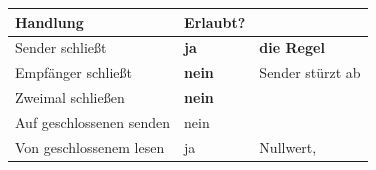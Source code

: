 \begin{merksatz}
\begin{warnung}
\begin{center}
\renewcommand{\arraystretch}{1.5}
\begin{tabular}{@{}P{3.0cm}P{2.2cm}P{2.8cm}@{}}
\toprule
\textbf{Handlung} & \textbf{Erlaubt?} & \\
\midrule
Sender schließt & \textcolor{gruen}{\textbf{ja}} & \textbf{die Regel}\\
Empfänger schließt & \textcolor{akzent}{\textbf{nein}} & \textcolor{akzent}{Sender stürzt ab}\\
Zweimal schließen & \textcolor{akzent}{\textbf{nein}} & \\
Auf geschlossenen senden & \textcolor{akzent}{nein} & \\
Von geschlossenem lesen & \textcolor{gruen}{ja} & \textcolor{gruen}{Nullwert, }\\
\bottomrule
\end{tabular}
\end{center}

\begin{center}
\begin{minipage}{0.88\textwidth}
\end{minipage}
\end{center}
\end{warnung}
\end{merksatz}

